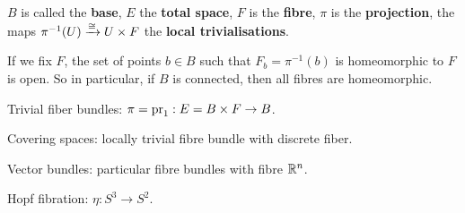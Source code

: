 $B$ is called the \textbf{base}, $E$ the \textbf{total space}, $F$ is the \textbf{fibre}, $\pi$ is the \textbf{projection}, the maps $\pi^{-1}(U)\xrightarrow{\cong} U\times F$ the \textbf{local trivialisations}.

If we fix $F$, the set of points $b\in B$ such that $F_b=\pi^{-1}(b)$ is homeomorphic to $F$ is open. So in particular, if $B$ is connected, then all fibres are homeomorphic.

\begin{examples}

Trivial fiber bundles: $\pi=\operatorname{pr}_1:E=B\times F\to B$.

Covering spaces: locally trivial fibre bundle with discrete fiber.

Vector bundles: particular fibre bundles with fibre ${\mathbb R}^n$.

Hopf fibration: $\eta:S^3\to S^2$.

\end{examples}

